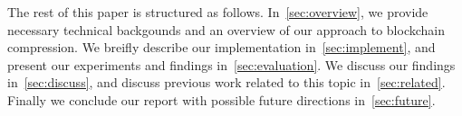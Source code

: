 The rest of this paper is structured as follows. In~\autoref{sec:overview}, we provide necessary technical backgounds
and an overview of our approach to \eth{} blockchain compression. We breifly describe our implementation in~\autoref{sec:implement},
and present our experiments and findings in~\autoref{sec:evaluation}. We discuss our findings in~\autoref{sec:discuss}, and discuss previous work related to this topic in~\autoref{sec:related}. Finally we conclude our report with possible future directions in~\autoref{sec:future}.

